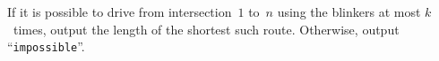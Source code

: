 
    If it is possible to drive from intersection~$1$ to~$n$ using the blinkers at most $k$~times,
    output the length of the shortest such route.
    Otherwise, output ``\texttt{impossible}''.
